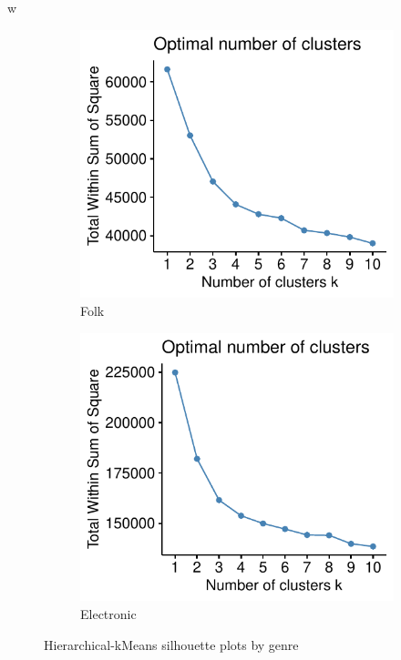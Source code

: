 w\documentclass[11pt, oneside]{article}
\begin{document}
\begin{figure}[h!]
    \vspace{1cm}
    \begin{subfigure}[b]{0.5\textwidth}
        \includegraphics[width=\textwidth]{folk_elbow.pdf} 
        \caption{Folk}
    \end{subfigure}%
    \begin{subfigure}[b]{0.5\textwidth}
        \includegraphics[width=\textwidth]{elec_elbow.pdf} 
        \caption{Electronic}
    \end{subfigure}%
\caption{Hierarchical-kMeans silhouette plots by genre}
\label{fig:elbplots}
\end{figure}
\end{document}
